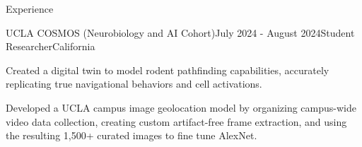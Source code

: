 \documentclass[
  10pt, %
]{resume}
\begin{document}
\begin{rSection}{Experience}
\begin{rSubsection}{UCLA COSMOS (Neurobiology and AI Cohort)}{July 2024 - August 2024}{Student Researcher}{California}
    \item Created a digital twin to model rodent pathfinding capabilities, accurately replicating true navigational behaviors and cell activations.
    
    \item Developed a UCLA campus image geolocation model by organizing campus-wide video data collection, creating custom artifact-free frame extraction, and using the resulting 1,500+ curated images to fine tune AlexNet.
    
  \end{rSubsection}
        
	
\end{rSection}

\end{document}
